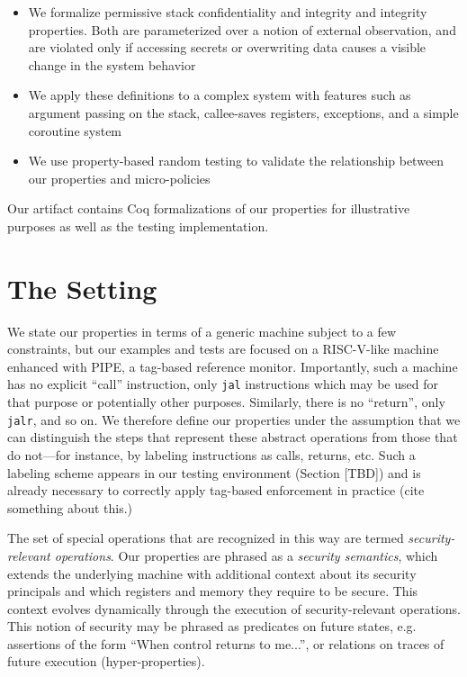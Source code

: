 \documentclass[10pt,conference]{ieeetran}%
\theoremstyle{definition}
\begin{document}
\begin{itemize}
\item We formalize permissive stack confidentiality and integrity and integrity properties.
  Both are parameterized over a notion of external
  observation, and are violated only if accessing secrets or overwriting
  data causes a visible change in the system behavior %
\item We apply these definitions to a complex system with features such as argument passing
  on the stack, callee-saves registers, exceptions, and a simple coroutine system%
\item We use property-based random testing to validate the relationship between
  our properties and micro-policies %
\end{itemize}

Our artifact contains Coq formalizations of our properties for illustrative purposes
as well as the testing implementation.

\section{The Setting}

We state our properties in terms of a generic machine subject to a few constraints,
but our examples and tests are focused on a RISC-V-like machine enhanced with PIPE,
a tag-based reference monitor. Importantly, such a machine has no explicit ``call''
instruction, only {\tt jal} instructions which may be used for that purpose or potentially
other purposes. Similarly, there is no ``return'', only {\tt jalr}, and so on.
We therefore define our properties under the assumption that we can distinguish the
steps that represent these abstract operations from those that do not---for instance,
by labeling instructions as calls, returns, etc.
Such a labeling scheme appears in
our testing environment (Section [TBD]) and is already necessary
to correctly apply tag-based enforcement in practice (cite something about this.)

The set of special operations that are recognized in this way are termed
{\it security-relevant operations}. Our properties are phrased as a {\it security semantics},
which extends the underlying machine with additional context about its
security principals and which registers and memory they require to be secure.
This context evolves dynamically through the execution of security-relevant operations.
This notion of security may be phrased as
predicates on future states, e.g. assertions of the form
``When control returns to me...'', or relations on traces of future execution
(hyper-properties).
\end{document}
